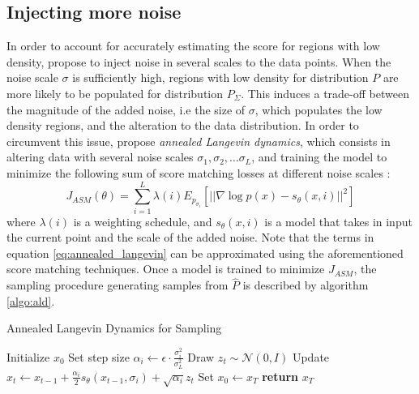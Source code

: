 \subsection{Injecting more noise}
In order to account for accurately estimating the score for regions with low density, \citep{song2020generativemodelingestimatinggradients} propose to inject noise in several scales to the data points. When the noise scale $\sigma$ is sufficiently high, regions with low density for distribution $P$ are more likely to be populated for distribution $P_{\Sigma}$. This induces a trade-off between the magnitude of the added noise, i.e the size of $\sigma$, which populates the low density regions, and the alteration to the data distribution. In order to circumvent this issue, \citep{song2020generativemodelingestimatinggradients} propose \textit{annealed Langevin dynamics}, which consists in altering data with several noise scales $\sigma_{1},\sigma_{2},\ldots \sigma_{L}$, and training the model to minimize the following sum of score matching losses at different noise scales : 
\begin{equation}\label{eq:annealed_langevin}
    J_{ASM}(\theta) = \sum_{i=1}^{L} \lambda(i)E_{p_{\sigma_{i}}}\left[ ||\nabla \log p(x) - s_{\theta}(x,i)||^{2}  \right]
\end{equation}
where $\lambda(i)$ is a weighting schedule, and $s_{\theta}(x,i)$ is a model that takes in input the current point and the scale of the added noise. Note that the terms in equation \ref{eq:annealed_langevin} can be approximated using the aforementioned score matching techniques.
Once a model is trained to minimize $J_{ASM}$, the sampling procedure generating samples from $\hat{P}$ is described by algorithm \ref{algo:ald}.
\begin{algorithm}
\caption{Annealed Langevin Dynamics for Sampling \citep{song2020generativemodelingestimatinggradients}}
\begin{algorithmic}[1]\label{algo:ald}
\State Initialize $x_0$
    \State Set step size $\alpha_i \leftarrow \epsilon \cdot \frac{\sigma_i^2}{\sigma_L^2}$
        \State Draw $z_t \sim \mathcal{N}(0, I)$
        \State Update $x_t \leftarrow x_{t-1} + \frac{\alpha_i}{2} s_\theta(x_{t-1}, \sigma_i) + \sqrt{\alpha_i} z_t$
    \EndFor
    \State Set $x_0 \leftarrow x_T$
\EndFor
\State \textbf{return} $x_T$
\end{algorithmic}
\end{algorithm}
